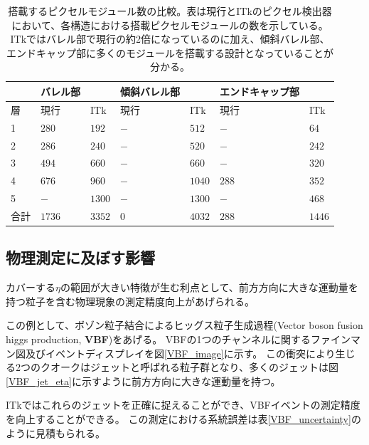 \begin{table}[tbp]
\begin{center}
\caption[搭載するピクセルモジュール数の比較]{搭載するピクセルモジュール数の比較。表は現行とITkのピクセル検出器において、各構造における搭載ピクセルモジュールの数を示している。ITkではバレル部で現行の約2倍になっているのに加え、傾斜バレル部、エンドキャップ部に多くのモジュールを搭載する設計となっていることが分かる。}
\label{compare_itk_modules}
  \begin{tabular}{|l||ll|ll|ll|} \hline
          & バレル部 &            & 傾斜バレル部 & & エンドキャップ部 & \\ \hline 
    層    & 現行     & ITk        & 現行& ITk          & 現行  & ITk \\ \hline
    1     & $280$    & $192$      & $-$ & $512$        & $-$   & $64$ \\ 
    2     & $286$    & $240$      & $-$ & $520$        & $-$   & $242$ \\ 
    3     & $494$    & $660$      & $-$ & $660$        & $-$   & $320$ \\ 
    4     & $676$    & $960$      & $-$ & $1040$       & $288$ & $352$ \\ 
    5     & $-$      & $1300$     & $-$ & $1300$       & $-$   & $468$ \\ \hline
    合計  & $1736$   & $3352$     & $0$ & $4032$       & $288$ & $1446$ \\ \hline\hline
  \end{tabular}
\end{center}
\end{table}

\clearpage
\subsection{物理測定に及ぼす影響}
カバーする$\eta$の範囲が大きい特徴が生む利点として、前方方向に大きな運動量を持つ粒子を含む物理現象の測定精度向上があげられる。

この例として、ボゾン粒子結合によるヒッグス粒子生成過程(Vector boson fusion higgs production, \textbf{VBF})をあげる。
VBFの1つのチャンネルに関するファインマン図及びイベントディスプレイを図\ref{VBF_image}に示す。
この衝突により生じる2つのクオークはジェットと呼ばれる粒子群となり、多くのジェットは図\ref{VBF_jet_eta}に示すように前方方向に大きな運動量を持つ。

ITkではこれらのジェットを正確に捉えることができ、VBFイベントの測定精度を向上することができる。
この測定における系統誤差は表\ref{VBF_uncertainty}のように見積もられる\cite{1-3}。

